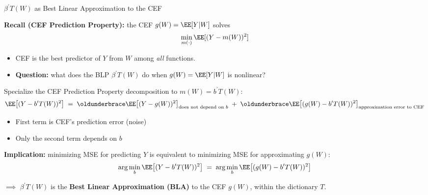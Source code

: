 \documentclass[compress, 8pt]{beamer}
\begin{document}
\begin{frame}{$\beta^\prime T(W)$ as Best Linear Approximation to the CEF}

    \textbf{Recall (CEF Prediction Property):} the CEF $g(W) = \EE[Y \vert W]$ solves
    \begin{equation*}
        \min_{m(\cdot)} \EE[(Y - m(W))^2]
    \end{equation*}
    \begin{itemize}
        \item [$\implies$] CEF is the best predictor of $Y$ from $W$ among \emph{all} functions.
        \item \textbf{Question:} what does the BLP $\beta^\prime T(W)$ do when $g(W) = \EE[Y \vert W]$ is nonlinear?
    \end{itemize}
    \pause
    Specialize the CEF Prediction Property decomposition to $m(W) = b^\prime T(W)$:
    \begin{equation*}
        \EE\big[(Y - b^\prime T(W))^2\big]
        \; = \;
        \underbrace{\EE\big[(Y - g(W))^2\big]}_{\text{does not depend on } b}
        \; + \;
        \underbrace{\EE\big[(g(W) - b^\prime T(W))^2\big]}_{\text{approximation error to CEF}}
    \end{equation*}
    \begin{itemize}
        \item First term is CEF's prediction error (noise)
        \item Only the second term depends on $b$
    \end{itemize}

    \vspace{2ex}
    \pause
    \textbf{Implication:} minimizing MSE for predicting $Y$ is equivalent to minimizing MSE for approximating $g(W)$:
    \begin{equation*}
        \arg\min_b \EE\big[(Y - b^\prime T(W))^2\big]
        \; = \;
        \arg\min_b \EE\big[(g(W) - b^\prime T(W))^2\big]
    \end{equation*}

    \vspace{1ex}
    $\implies$ $\beta^\prime T(W)$ is the \textbf{Best Linear Approximation (BLA)} to the CEF $g(W)$, within the dictionary $T$.
\end{frame}
\end{document}
